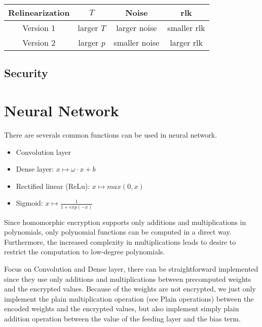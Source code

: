 \documentclass[A4paper,12pt]{article}
\begin{document}
\begin{table}[ht] 
	\label{tab:tbCmpRLK2}
	\centering      %
	\begin{tabular}{|c|c|c|c|}  %
		\hline                      %
		Relinearization & $T$ & Noise & rlk \\ [0.5ex] %
		\hline            %
		Version 1 & larger $T$ & larger noise & smaller rlk \\   %
		\hline 
		Version 2 & larger $p$ & smaller noise & larger rlk \\ [1ex]       %
		
		\hline     %
	\end{tabular} 
	\label{table:nonlin}  %
\end{table}

\subsection{Security}


\section{Neural Network}

There are severals common functions can be used in neural network. 
\begin{itemize}
	\item Convolution layer
	\item Dense layer: $x \mapsto \omega \cdot x + b$
	\item Rectified linear (ReLu): $x \mapsto max(0, x)$
	\item Sigmoid: $x \mapsto \frac{1}{1 + exp(-x)}$
\end{itemize}

Since homomorphic encryption supports only additions and multiplications in polynomials, only polynomial functions can be computed in a direct way. Furthermore, the increased complexity in multiplications leads to desire to restrict the computation to low-degree polynomials.

Focus on Convolution and Dense layer, there can be straightforward implemented since they use only additions and multiplications between precomputed weights and the encrypted values. Because of the weights are not encrypted, we just only implement the plain multiplication operation (see Plain operations) between the encoded weights and the encrypted values, but also implement simply plain addition operation between the value of the feeding layer and the bias term.
\end{document}
